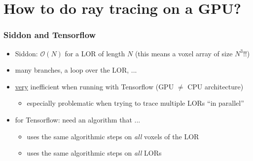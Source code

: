 \documentclass{beamer}
\begin{document}
\section{How to do ray tracing on a GPU?}
\begin{frame}
  \frametitle{Siddon and Tensorflow}
  \begin{itemize}
  \item Siddon: $\mathcal{O}(N)$ for a LOR of length $N$ (this means a voxel array of size $N^3$!!)
    \pause
  \item many branches, a loop over the LOR, ...
    \pause
  \item \underline{very} inefficient when running with Tensorflow (GPU $\neq$ CPU architecture)
    \begin{itemize}
    \item especially problematic when trying to trace multiple LORs ``in parallel''
    \end{itemize}

    \pause
    
    \item for Tensorflow: need an algorithm that ...
      \begin{itemize}
        \item uses the same algorithmic steps on \textsl{all} voxels of the LOR
        \item uses the same algorithmic steps on \textsl{all} LORs
      \end{itemize}
  \end{itemize}
\end{frame}
\end{document}
